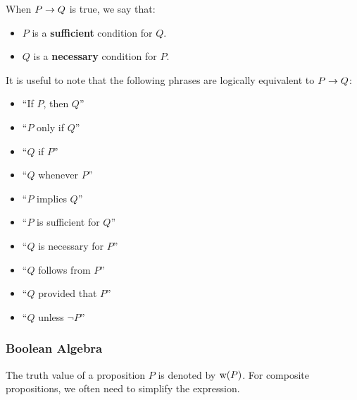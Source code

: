 \begin{definition}
    When $P \rightarrow Q$ is true, we say that:
    \begin{itemize}
        \item $P$ is a \textbf{sufficient} condition for $Q$.
        \item $Q$ is a \textbf{necessary} condition for $P$.
    \end{itemize}
\end{definition}

\begin{remark}
    It is useful to note that the following phrases are logically equivalent to $P \rightarrow Q$:
    \begin{multicols}{3}
        \begin{itemize}
            \item ``If $P$, then $Q$''
            \item ``$P$ only if $Q$''
            \item ``$Q$ if $P$''
            \item ``$Q$ whenever $P$''
            \item ``$P$ implies $Q$''
            \item ``$P$ is sufficient for $Q$''
            \item ``$Q$ is necessary for $P$''
            \item ``$Q$ follows from $P$''
            \item ``$Q$ provided that $P$''
            \item ``$Q$ unless $\neg P$''
        \end{itemize}
    \end{multicols}
\end{remark}

\subsubsection{Boolean Algebra}

The truth value of a proposition $P$ is denoted by $\text{w(}P\text{)}$. For composite propositions,
we often need to simplify the expression.

